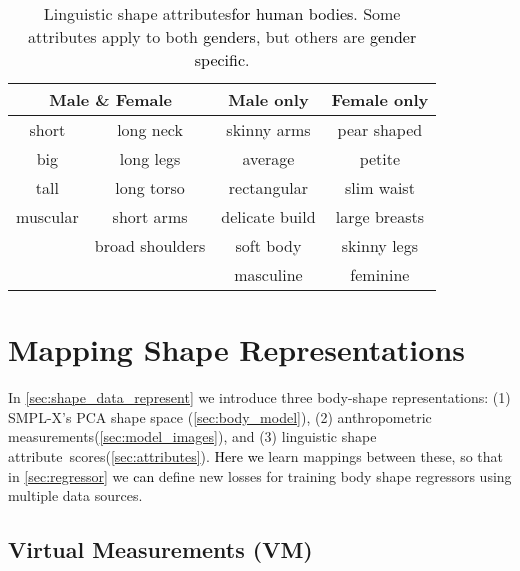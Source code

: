 \documentclass[10pt,twocolumn,letterpaper]{article}
\newcommand{\StoM}{VM\xspace}
\newcommand{\vspaceTABaboveCaption}{-0.0 em}
\newcommand{\smplx}{\mbox{SMPL-X}\xspace}
\newcommand{\smplX}{\smplx}
\newcommand{\cameraready}[1]{\textcolor{Fuchsia}{{#1}}\xspace}
\renewcommand{\cameraready}[1]{\textcolor{black}{{#1}}\xspace}
\newcommand{\myarraystretch}[0]{1.1}
\newcommand{\colorTERM}{blue}
\renewcommand{\colorTERM}{black}
\newcommand{\measurements}[0]{{\color{\colorTERM}anthropometric measurements}\xspace}
\newcommand{\linguisticshapeattribute}[0]{{\color{\colorTERM}linguistic shape attribute}\xspace}
\newcommand{\Linguisticshapeattributes}[0]{{\color{\colorTERM}Linguistic shape attributes}\xspace}
\newcommand{\scores}[0]{{scores}\xspace}
\begin{document}
\begin{table}
\renewcommand{\arraystretch}{\myarraystretch} 
    \centering
    \footnotesize
    \begin{tabular}{c c||c|c}
        \multicolumn{2}{c||}{\bf Male \& Female}    & {\bf Male only}   & {\bf Female only} \\ \hline
        short           &   long neck               & skinny arms       & pear shaped       \\
        big             &   long legs               & average           & petite            \\
        tall            &   long torso              & rectangular       & slim waist        \\
        muscular        &   short arms              & delicate build    & large breasts     \\
                        &   broad shoulders         & soft body         & skinny legs       \\
                        &                           & masculine         & feminine          
    \end{tabular}
    \vspace{\vspaceTABaboveCaption}
    \caption{   
        \Linguisticshapeattributes \cameraready{for human bodies}. Some attributes apply to both \cameraready{genders}, 
        but others are 
        \cameraready{gender specific}. 
    }
    \label{tab:selected_attributes}
\end{table}
  \section{Mapping Shape Representations} 
\label{sec:mappings}


In \cref{sec:shape_data_represent} we introduce three body-shape representations: (1)     \smplX's PCA shape space            (\cref{sec:body_model}), 
(2)     \measurements                       (\cref{sec:model_images}), and
(3)     \linguisticshapeattribute~\scores   (\cref{sec:attributes}). 
\cameraready{Here we} learn mappings between these, so that in \cref{sec:regressor} we \cameraready{can} define new losses for training body shape regressors using multiple data sources.

\subsection{Virtual Measurements (\StoM)}
\label{sec:virtual_measurements}
\end{document}
